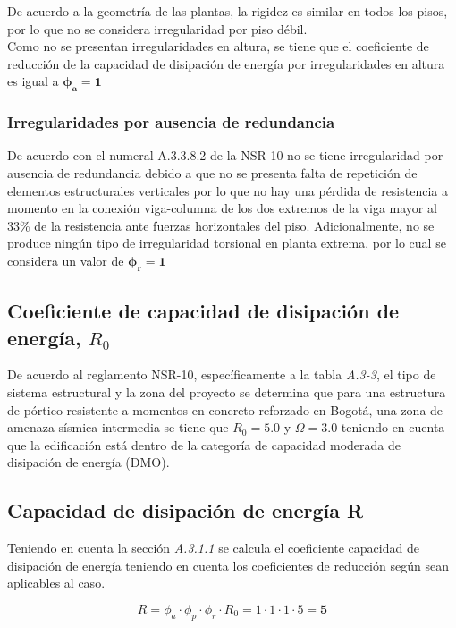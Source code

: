 \documentclass[12pt]{article}
\begin{document}
De acuerdo a la geometría de las plantas, la rigidez es similar en todos los pisos, por lo que no se considera irregularidad por piso débil.\\

Como no se presentan irregularidades en altura, se tiene que el coeficiente de reducción de la capacidad de disipación de energía por irregularidades en altura es igual a $\mathbf{\phi_{a}=1}$

\subsubsection{Irregularidades por ausencia de redundancia}


De acuerdo con el numeral A.3.3.8.2 de la NSR-10 no se tiene irregularidad por ausencia de redundancia debido a que no se presenta falta de repetición de elementos estructurales verticales por lo que no hay una pérdida de resistencia a momento en la conexión viga-columna de los dos extremos de la viga mayor al 33\% de la resistencia ante fuerzas horizontales del piso. Adicionalmente, no se produce ningún tipo de irregularidad torsional en planta extrema, por lo cual se considera un valor de $\mathbf{\phi_{r}=1}$

 
 
 


\subsection{Coeficiente de capacidad de disipación de energía, $R_{0}$}

De acuerdo al reglamento NSR-10, específicamente a la tabla \textit{A.3-3}, el tipo de sistema estructural y la zona del proyecto se determina que para una estructura de pórtico resistente a momentos en concreto reforzado en Bogotá, una zona de amenaza sísmica intermedia se tiene que $R_0=5.0$ y $\Omega=3.0$ teniendo en cuenta que la edificación está dentro de la categoría de capacidad moderada de disipación de energía (DMO).

\subsection{Capacidad de disipación de energía R}

Teniendo en cuenta la sección \textit{A.3.1.1} se calcula el coeficiente capacidad de disipación de energía teniendo en cuenta los coeficientes de reducción según sean aplicables al caso.

\begin{equation*}
    R=\phi_{a}\cdot \phi_{p}\cdot \phi_{r}\cdot R_{0}=1\cdot 1\cdot 1\cdot 5=\mathbf{5}
\end{equation*}
\end{document}
